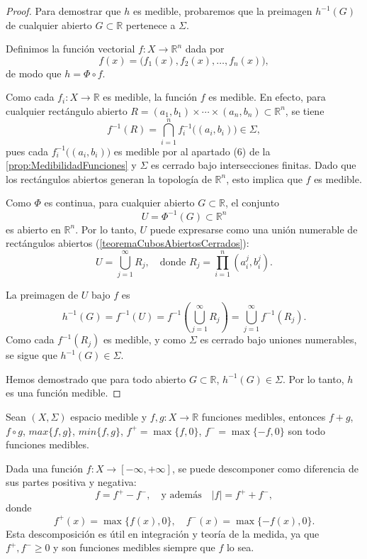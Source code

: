 \begin{proof}
    Para demostrar que $h$ es medible, probaremos que la preimagen $h^{-1}(G)$ de cualquier abierto $G \subset \mathbb{R}$ pertenece a $\Sigma$.

    Definimos la función vectorial $f \colon X \to \mathbb{R}^n$ dada por
    \[
        f(x) = \big( f_1(x), f_2(x), \dots, f_n(x) \big),
    \]
    de modo que $h = \Phi \circ f$.

    Como cada $f_i \colon X \to \mathbb{R}$ es medible, la función $f$ es medible.
    En efecto, para cualquier rectángulo abierto $R = (a_1, b_1) \times \cdots
        \times (a_n, b_n) \subset \mathbb{R}^n$, se tiene
    \[
        f^{-1}(R) = \bigcap_{i=1}^n f_i^{-1}\big( (a_i, b_i) \big) \in \Sigma,
    \]
    pues cada $f_i^{-1}\big( (a_i, b_i) \big)$ es medible por al apartado (6) de la
    \cref{prop:MedibilidadFunciones} y $\Sigma$ es cerrado bajo intersecciones
    finitas. Dado que los rectángulos abiertos generan la topología de
    $\mathbb{R}^n$, esto implica que $f$ es medible.

    Como $\Phi$ es continua, para cualquier abierto $G \subset \mathbb{R}$, el
    conjunto
    \[
        U = \Phi^{-1}(G) \subset \mathbb{R}^n
    \]
    es abierto en $\mathbb{R}^n$. Por lo tanto, $U$ puede expresarse como una unión
    numerable de rectángulos abiertos (\cref{teoremaCubosAbiertosCerrados}):
    \[
        U = \bigcup_{j=1}^\infty R_j, \quad \text{donde } R_j = \prod_{i=1}^n (a_i^j, b_i^j).
    \]

    La preimagen de $U$ bajo $f$ es
    \[
        h^{-1}(G) = f^{-1}(U) = f^{-1}\left( \bigcup_{j=1}^\infty R_j \right) = \bigcup_{j=1}^\infty f^{-1}(R_j).
    \]
    Como cada $f^{-1}(R_j)$ es medible, y como $\Sigma$ es cerrado bajo uniones
    numerables, se sigue que $h^{-1}(G) \in \Sigma$.

    Hemos demostrado que para todo abierto $G \subset \mathbb{R}$, $h^{-1}(G) \in
        \Sigma$. Por lo tanto, $h$ es una función medible.
\end{proof}

\begin{corolario}
    Sean $(X, \Sigma)$ espacio medible y $f, g: X \to \mathbb{R}$ funciones medibles, entonces $f + g$, $f \circ g$, $max\{f, g\}$, $min\{f, g\}$, $f^+=\max\{f, 0\}$, $f^- = \max\{-f, 0\}$ son todo funciones medibles.
\end{corolario}
\begin{observación}
Dada una función \( f \colon X \to [-\infty,+\infty] \), se puede descomponer como diferencia de sus partes positiva y negativa:
\[
    f = f^+ - f^-, \quad \text{y además} \quad |f| = f^+ + f^-,
\]
donde
\[
    f^+(x) = \max\{f(x), 0\}, \quad f^-(x) = \max\{-f(x), 0\}.
\]
Esta descomposición es útil en integración y teoría de la medida, ya que \(
f^+, f^- \geq 0 \) y son funciones medibles siempre que \( f \) lo sea.
\end{observación}

